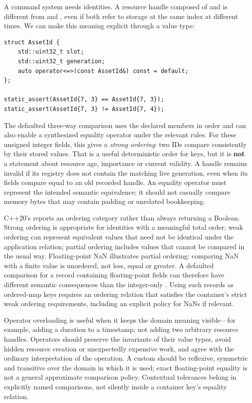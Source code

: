 A command system needs identities. A resource handle composed of  and  is different from  and , even if both refer to storage at the same index at different times. We can make this meaning explicit through a value type:

\begin{verbatim}
struct AssetId {
    std::uint32_t slot;
    std::uint32_t generation;
    auto operator<=>(const AssetId&) const = default;
};

static_assert(AssetId{7, 3} == AssetId{7, 3});
static_assert(AssetId{7, 3} != AssetId{7, 4});
\end{verbatim}

The defaulted three-way comparison uses the declared members in order and can also enable a synthesized equality operator under the relevant rules. For these unsigned integer fields, this gives a \emph{strong ordering}: two IDs compare consistently by their stored values. That is a useful deterministic order for keys, but it is \textbf{not} a statement about resource age, importance or current validity. A handle remains invalid if its registry does not contain the matching live generation, even when its fields compare equal to an old recorded handle. An equality operator must represent the intended semantic equivalence; it should not casually compare memory bytes that may contain padding or unrelated bookkeeping.

C++20's \BookInlineCode{\textless=\textgreater{}} reports an ordering category rather than always returning a Boolean. Strong ordering is appropriate for identities with a meaningful total order; weak ordering can represent equivalent values that need not be identical under the application relation; partial ordering includes values that cannot be compared in the usual way. Floating-point NaN illustrates partial ordering: comparing NaN with a finite value is unordered, not less, equal or greater. A defaulted comparison for a record containing floating-point fields can therefore have different semantic consequences than the integer-only . Using such records as ordered-map keys requires an ordering relation that satisfies the container's strict weak ordering requirements, including an explicit policy for NaNs if relevant.

Operator overloading is useful when it keeps the domain meaning visible---for example, adding a duration to a timestamp, not adding two arbitrary resource handles. Operators should preserve the invariants of their value types, avoid hidden resource creation or unexpectedly expensive work, and agree with the ordinary interpretation of the operation. A custom  should be reflexive, symmetric and transitive over the domain in which it is used; exact floating-point equality is not a general approximate comparison policy. Contextual tolerances belong in explicitly named comparisons, not silently inside a container key's equality relation.

